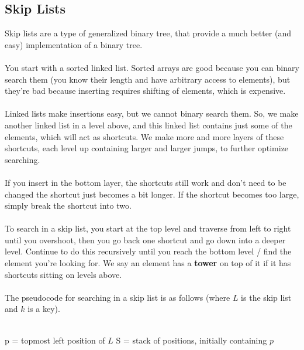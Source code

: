 \documentclass[]{article}
\theoremstyle{definition}
\newcommand{\lecture}[1]{\marginpar{{\footnotesize $\leftarrow$ \underline{#1}}}}
\begin{document}
		\subsection{Skip Lists}
			Skip lists are a type of generalized binary tree, that provide a much better (and easy) implementation of a binary tree. 
			\\ \\
			You start with a sorted linked list. Sorted arrays are good because you can binary search them (you know their length and have arbitrary access to elements), but they're bad because inserting requires shifting of elements, which is expensive.
			\\ \\
			Linked lists make insertions easy, but we cannot binary search them. So, we make another linked list in a level above, and this linked list contains just some of the elements, which will act as shortcuts. We make more and more layers of these shortcuts, each level up containing larger and larger jumps, to further optimize searching.
			\\ \\
			If you insert in the bottom layer, the shortcuts still work and don't need to be changed \textendash{} the shortcut just becomes a bit longer. If the shortcut becomes too large, simply break the shortcut into two. \lecture{March 12, 2013}
			\\ \\
			To search in a skip list, you start at the top level and traverse from left to right until you overshoot, then you go back one shortcut and go down into a deeper level. Continue to do this recursively until you reach the bottom level / find the element you're looking for. We say an element has a \textbf{tower} on top of it if it has shortcuts sitting on levels above.
			\\ \\
			The pseudocode for searching in a skip list is as follows (where $L$ is the skip list and $k$ is a key). \\ \\
			\begin{algorithm}[H]
				p = topmost left position of $L$\;
				S = stack of positions, initially containing $p$\;
			\end{algorithm}
\end{document}
